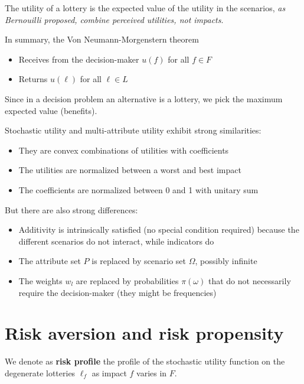 The utility of a lottery is the expected value of the utility in the scenarios, \textit{as Bernouilli proposed, combine perceived utilities, not impacts}.

In summary, the Von Neumann-Morgenstern theorem
\begin{itemize}
	\item Receives from the decision-maker $u(f)$ for all $f \in F$
	
	\item Returns $u(\ell)$ for all $\ell \in L$
\end{itemize}

Since in a decision problem an alternative is a lottery, we pick the maximum expected value (benefits).

Stochastic utility and multi-attribute utility exhibit strong similarities:
\begin{itemize}
	\item They are convex combinations of utilities with coefficients
	
	\item The utilities are normalized between a worst and best impact
	
	\item The coefficients are normalized between 0 and 1 with unitary sum
\end{itemize}

But there are also strong differences:
\begin{itemize}
	\item Additivity is intrinsically satisfied (no special condition required) because the different scenarios do not interact, while indicators do
	
	\item The attribute set $P$ is replaced by scenario set $\Omega$, possibly infinite
	
	\item The weights $w_l$ are replaced by probabilities $\pi (\omega)$ that do not necessarily require the decision-maker (they might be frequencies)
\end{itemize}

\section{Risk aversion and risk propensity}
\label{sec:riskaversion}

\begin{definition}
	We denote as \textbf{risk profile} the profile of the stochastic utility function on the degenerate lotteries $\ell_f$ as impact $f$ varies in $F$.
\end{definition}

